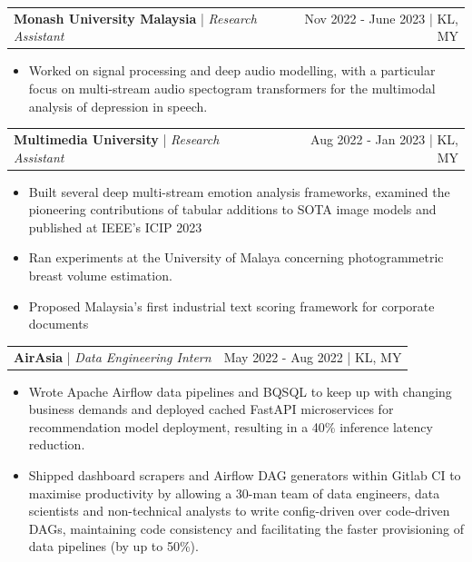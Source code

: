 \documentclass[a4paper,12pt]{article}
\makeatletter
\newcommand{\ExternalLink}{%
    \tikz[x=1.2ex, y=1.2ex, baseline=-0.05ex]{%
        \begin{scope}[x=1ex, y=1ex]
            \clip (-0.1,-0.1)
                --++ (-0, 1.2)
                --++ (0.6, 0)
                --++ (0, -0.6)
                --++ (0.6, 0)
                --++ (0, -1);
            \path[draw,
                line width = 0.5,
                rounded corners=0.5]
                (0,0) rectangle (1,1);
        \end{scope}
        \path[draw, line width = 0.5] (0.5, 0.5)
            -- (1, 1);
        \path[draw, line width = 0.5] (0.6, 1)
            -- (1, 1) -- (1, 0.6);
        }
    }
\newcommand{\resumeItem}[1]{
  \item{
    {#1 \vspace{-2pt}}
  }
}
\newcommand{\resumeSubheading}[4]{
  \vspace{-1pt}\item
    \begin{tabular*}{0.97\textwidth}[t]{l@{\extracolsep{\fill}}r}
      \textbf{#1} & \small{#2} \\
      \textit{#3} & \textit{#4} \\
    \end{tabular*}\vspace{-6pt}
}
\newcommand{\subheadingSingle}[2]{
  \vspace{-1pt}\item
    \begin{tabular*}{0.97\textwidth}[t]{l@{\extracolsep{\fill}}r}
      #1 & \small{#2} \\
    \end{tabular*}\vspace{-6pt}
}
\newcommand{\resumeItemListStart}{\begin{itemize}}
\newcommand{\resumeItemListEnd}{\end{itemize}\vspace{-5pt}}
\makeatother
\begin{document}
  \subheadingSingle
  {\textbf{Monash University Malaysia} | \textit{Research Assistant}}{Nov 2022 - June 2023 | KL, MY}
  \resumeItemListStart
    \resumeItem{Worked on signal processing and deep audio modelling, with a particular focus on multi-stream audio spectogram transformers for the multimodal analysis of depression in speech.}
  \resumeItemListEnd

  \subheadingSingle
  {\textbf{Multimedia University} | \textit{Research Assistant}}{Aug 2022 - Jan 2023 | KL, MY}
  \resumeItemListStart
    \resumeItem{Built several deep multi-stream emotion analysis frameworks, examined the pioneering contributions of tabular additions to SOTA image models and published at IEEE's ICIP 2023}
    \resumeItem{Ran experiments at the University of Malaya concerning photogrammetric breast volume estimation.}
    \resumeItem{Proposed Malaysia's first industrial text scoring framework for corporate documents}
  \resumeItemListEnd

  \subheadingSingle
  {\textbf{AirAsia} | \textit{Data Engineering Intern}}{May 2022 - Aug 2022 | KL, MY}
  \resumeItemListStart
    \resumeItem{Wrote Apache Airflow data pipelines and BQSQL to keep up with changing business demands and deployed cached FastAPI microservices for recommendation model deployment, resulting in a 40\% inference latency reduction.}
    \resumeItem{Shipped dashboard scrapers and Airflow DAG generators within Gitlab CI to maximise productivity by allowing a 30-man team of data engineers, data scientists and non-technical analysts to write config-driven over code-driven DAGs, maintaining code consistency and facilitating the faster provisioning of data pipelines (by up to 50\%).}
  \resumeItemListEnd

\end{document}
